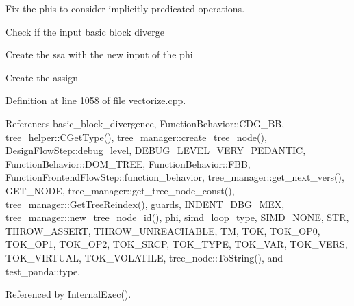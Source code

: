 Fix the phis to consider implicitly predicated operations. 

Check if the input basic block diverge

Create the ssa with the new input of the phi

Create the assign 

Definition at line 1058 of file vectorize.\+cpp.



References basic\+\_\+block\+\_\+divergence, Function\+Behavior\+::\+C\+D\+G\+\_\+\+BB, tree\+\_\+helper\+::\+C\+Get\+Type(), tree\+\_\+manager\+::create\+\_\+tree\+\_\+node(), Design\+Flow\+Step\+::debug\+\_\+level, D\+E\+B\+U\+G\+\_\+\+L\+E\+V\+E\+L\+\_\+\+V\+E\+R\+Y\+\_\+\+P\+E\+D\+A\+N\+T\+IC, Function\+Behavior\+::\+D\+O\+M\+\_\+\+T\+R\+EE, Function\+Behavior\+::\+F\+BB, Function\+Frontend\+Flow\+Step\+::function\+\_\+behavior, tree\+\_\+manager\+::get\+\_\+next\+\_\+vers(), G\+E\+T\+\_\+\+N\+O\+DE, tree\+\_\+manager\+::get\+\_\+tree\+\_\+node\+\_\+const(), tree\+\_\+manager\+::\+Get\+Tree\+Reindex(), guards, I\+N\+D\+E\+N\+T\+\_\+\+D\+B\+G\+\_\+\+M\+EX, tree\+\_\+manager\+::new\+\_\+tree\+\_\+node\+\_\+id(), phi, simd\+\_\+loop\+\_\+type, S\+I\+M\+D\+\_\+\+N\+O\+NE, S\+TR, T\+H\+R\+O\+W\+\_\+\+A\+S\+S\+E\+RT, T\+H\+R\+O\+W\+\_\+\+U\+N\+R\+E\+A\+C\+H\+A\+B\+LE, TM, T\+OK, T\+O\+K\+\_\+\+O\+P0, T\+O\+K\+\_\+\+O\+P1, T\+O\+K\+\_\+\+O\+P2, T\+O\+K\+\_\+\+S\+R\+CP, T\+O\+K\+\_\+\+T\+Y\+PE, T\+O\+K\+\_\+\+V\+AR, T\+O\+K\+\_\+\+V\+E\+RS, T\+O\+K\+\_\+\+V\+I\+R\+T\+U\+AL, T\+O\+K\+\_\+\+V\+O\+L\+A\+T\+I\+LE, tree\+\_\+node\+::\+To\+String(), and test\+\_\+panda\+::type.



Referenced by Internal\+Exec().

